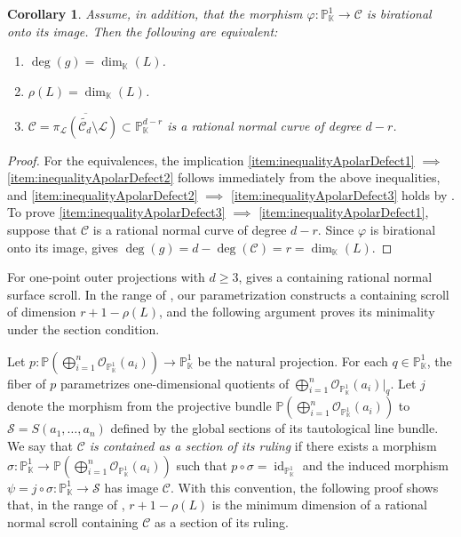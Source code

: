 \documentclass[a4paper, 11pt]{amsart}
\numberwithin{theorem}{section}
\newtheorem{corollary}[theorem]{Corollary}
\theoremstyle{definition}
\numberwithin{equation}{section}
\begin{document}
\begin{corollary}\label{cor:RNC}
Assume, in addition, that the morphism $\varphi:\mathbb{P}_{\mathbb{K}}^1 \rightarrow \mathcal{C}$ is birational onto its image.
Then the following are equivalent:
\begin{enumerate}[label=\textnormal{(\roman*)}]
    \item\label{item:inequalityApolarDefect1} $\deg(g) = \dim_{\mathbb{K}}(L)$.
    \item\label{item:inequalityApolarDefect2} $\rho(L) = \dim_{\mathbb{K}}(L)$.
    \item\label{item:inequalityApolarDefect3} $\mathcal{C} = \overline{\pi_{\mathcal{L}}(\widetilde{\mathcal{C}_d}\setminus \mathcal{L})}\subset \mathbb{P}_{\mathbb{K}}^{d-r}$ is a rational normal curve of degree $d-r$.
\end{enumerate}
\end{corollary}
\begin{proof}
For the equivalences, the implication \ref{item:inequalityApolarDefect1} $\implies$ \ref{item:inequalityApolarDefect2} follows immediately from the above inequalities, and \ref{item:inequalityApolarDefect2} $\implies$ \ref{item:inequalityApolarDefect3} holds by .
To prove \ref{item:inequalityApolarDefect3} $\implies$ \ref{item:inequalityApolarDefect1}, suppose that $\mathcal{C}$ is a rational normal curve of degree $d-r$.
Since $\varphi$ is birational onto its image,  gives $\deg(g)=d-\deg(\mathcal{C})=r=\dim_{\mathbb{K}}(L)$.
\end{proof}
For one-point outer projections with $d\geq3$, \cite[Theorem 7.3]{MR2274517} gives a containing rational normal surface scroll.
In the range of , our parametrization constructs a containing scroll of dimension $r+1-\rho(L)$, and the following argument proves its minimality under the section condition.

Let $p:\mathbb P(\bigoplus_{i=1}^n \mathcal{O}_{\mathbb{P}^1_{\mathbb{K}}}(a_i)) \to\mathbb{P}^1_{\mathbb{K}}$ be the natural projection.
For each $q\in\mathbb P^1_{\mathbb K}$, the fiber of $p$ parametrizes one-dimensional quotients of $\bigoplus_{i=1}^n\mathcal{O}_{\mathbb{P}^1_{\mathbb{K}}}(a_i)|_q$.
Let $j$ denote the morphism from the projective bundle $\mathbb P(\bigoplus_{i=1}^n \mathcal{O}_{\mathbb{P}^1_{\mathbb{K}}}(a_i))$ to $\mathcal{S}=S(a_1,\dots,a_n)$ defined by the global sections of its tautological line bundle.
We say that \emph{$\mathcal{C}$ is contained as a section of its ruling}
if there exists a morphism
$\sigma:\mathbb P^1_{\mathbb K}\to
\mathbb P(\bigoplus_{i=1}^n\mathcal O_{\mathbb P^1_{\mathbb K}}(a_i))$
such that $p\circ\sigma=\operatorname{id}_{\mathbb P^1_{\mathbb K}}$
and the induced morphism
$\psi=j\circ\sigma:\mathbb P^1_{\mathbb K}\to\mathcal S$
has image $\mathcal C$.
With this convention, the following proof shows that, in the range of ,
$r+1-\rho(L)$ is the minimum dimension of a rational normal
scroll containing $\mathcal{C}$ as a section of its ruling.
\end{document}
